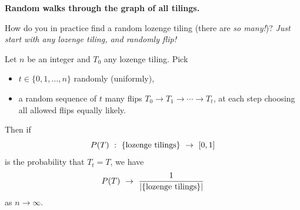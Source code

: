 \documentclass[11pt,fleqn]{book} %
\begin{document}
\textbf{Random walks through the graph of all tilings. }


\noindent
  How do you in practice find a random lozenge tiling (there are \textit{so many!})? \textit{Just start with any lozenge tiling, and randomly flip!}
    \begin{theorem}
      Let $n$ be an integer and $T_0$ any lozenge tiling. Pick 
      \begin{itemize}
       \item $t\in \{0,1,\ldots ,n\}$ randomly (uniformly),
       \item a random sequence of $t$ many flips $T_0\to T_1\to \cdots \to T_t$, at each step choosing all allowed flips equally likely. 
      \end{itemize}
      Then if 
      $$P(T) \ : \ \{\textup{lozenge tilings}\} \ \to \ [0,1]$$
      is the probability that $T_t=T$, we have 
      $$P(T) \ \to \ \frac{1}{|\{\textup{lozenge tilings}\}|}$$
      as $n \to \infty$.
    \end{theorem}
\end{document}

